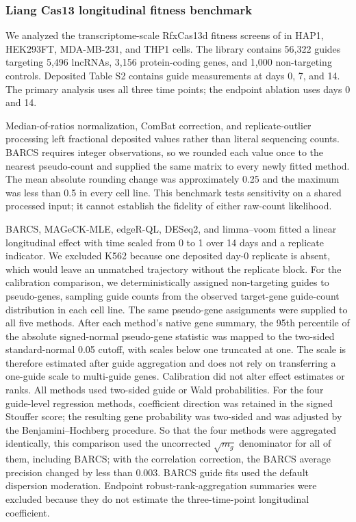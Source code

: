 \subsubsection{Liang Cas13 longitudinal fitness benchmark}

We analyzed the transcriptome-scale RfxCas13d fitness screens of
\citet{liang2026lncrna} in HAP1, HEK293FT, MDA-MB-231, and THP1 cells. The
library contains 56,322 guides targeting 5,496 lncRNAs, 3,156 protein-coding
genes, and 1,000 non-targeting controls.  Deposited Table S2 contains guide
measurements at days 0, 7, and 14.  The primary analysis uses all three time
points; the endpoint ablation uses days 0 and 14.

Median-of-ratios normalization, ComBat correction, and replicate-outlier
processing left fractional deposited values rather than literal sequencing
counts.  BARCS requires integer observations, so we rounded each value once to
the nearest pseudo-count and supplied the same matrix to every newly fitted
method.  The mean absolute rounding change was approximately 0.25 and the
maximum was less than 0.5 in every cell line. This benchmark tests sensitivity
on a shared processed input; it cannot establish the fidelity of either
raw-count likelihood.

BARCS, MAGeCK-MLE, edgeR-QL, DESeq2, and limma--voom fitted a linear
longitudinal effect with time scaled from 0 to 1 over 14 days and a replicate
indicator.  We excluded K562 because one deposited day-0 replicate is absent,
which would leave an unmatched trajectory without the replicate block. For the
calibration comparison, we deterministically assigned non-targeting guides to
pseudo-genes, sampling guide counts from the observed target-gene guide-count
distribution in each cell line.  The same pseudo-gene assignments were
supplied to all five methods.  After each method's native gene summary, the
95th percentile of the absolute signed-normal pseudo-gene statistic was mapped
to the two-sided standard-normal 0.05 cutoff, with scales below one truncated
at one.  The scale is therefore estimated after guide aggregation and does not
rely on transferring a one-guide scale to multi-guide genes.  Calibration did
not alter effect estimates or ranks.  All methods used two-sided guide or Wald
probabilities.  For the four guide-level regression methods, coefficient
direction was retained in the signed Stouffer score; the resulting gene
probability was two-sided and was adjusted by the Benjamini--Hochberg
procedure.  So that the four methods were aggregated identically, this
comparison used the uncorrected $\sqrt{m_g}$ denominator for all of them,
including BARCS; with the correlation correction, the BARCS average precision
changed by less than 0.003.  BARCS guide fits used the default dispersion
moderation.  Endpoint robust-rank-aggregation summaries \citep{kolde2012rra}
were excluded because they do not estimate the three-time-point longitudinal
coefficient.

